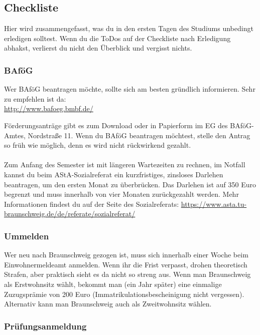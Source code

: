 
\subsection{Checkliste}
\label{checkliste}
	Hier wird zusammengefasst, was du in den ersten Tagen des Studiums unbedingt erledigen solltest. Wenn du die ToDos auf der Checkliste nach Erledigung abhakst, verlierst du nicht den Überblick und vergisst nichts.
	
\vspace*{0.5cm}
\begin{multicols}{2}
\subsubsection{BAföG}
	\label{todobafoeg}

	Wer BAföG beantragen möchte, sollte sich am besten gründlich informieren. Sehr zu empfehlen ist da: \\
	\url{http://www.bafoeg.bmbf.de/}
 
	Förderungsanträge gibt es zum Download oder in Papierform im EG des BAföG-Amtes, Nordstraße 11. Wenn du BAföG beantragen möchtest, stelle den Antrag so früh wie möglich, denn es wird nicht rückwirkend gezahlt.\\\\
	Zum Anfang des Semester ist mit längeren Wartezeiten zu rechnen, im Notfall kannst du beim AStA-Sozialreferat ein kurzfristiges, zinsloses Darlehen beantragen, um den ersten Monat zu überbrücken. Das Darlehen ist auf 350 Euro begrenzt und muss innerhalb von vier Monaten zurückgezahlt werden. Mehr Informationen findest du auf der Seite des Sozialreferats: \url{https://www.asta.tu-braunschweig.de/de/referate/sozialreferat/}


\subsubsection{Ummelden}
	\label{todoummelden}

	Wer neu nach Braunschweig gezogen ist, muss sich innerhalb einer Woche beim Einwohnermeldeamt anmelden. Wenn ihr die Frist verpasst, drohen theoretisch Strafen, aber praktisch sieht es da nicht so streng aus. Wenn man Braunschweig als Erstwohnsitz wählt, bekommt man (ein Jahr später) eine einmalige Zuzugsprämie von 200 Euro (Immatrikulationsbescheinigung nicht vergessen). Alternativ kann man Braunschweig auch als Zweitwohnsitz wählen.

\subsubsection{Prüfungsanmeldung}
	\label{todoanmeldung}


\end{multicols}
